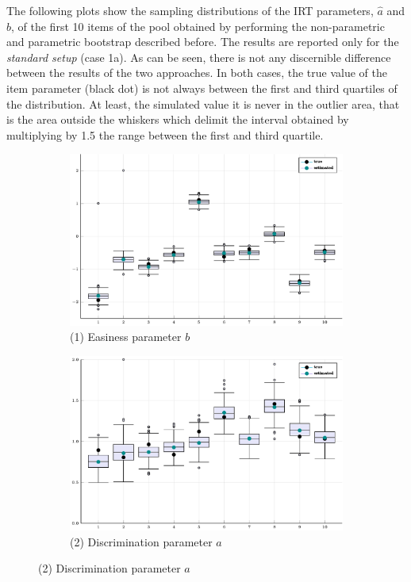 The following plots show the sampling distributions of the IRT parameters, $\hat{a}$ and $\hat{b}$, of the first 10 items of the pool obtained by performing the non-parametric and parametric bootstrap described before. The results are reported only for the \emph{standard setup} (case 1a).
As can be seen, there is not any discernible difference between the results of the two approaches. In both cases, the true value of the item parameter (black dot) is not always between the first and third quartiles of the distribution. At least, the simulated value it is never in the outlier area, that is the area outside the whiskers which delimit the interval obtained by multiplying by 1.5 the range between the first and third quartile.

\captionsetup[subfigure]{labelformat=empty}

\begin{figure}[H]
	\centering
	\begin{subfigure}[t]{0.8\textwidth}
		\centering
		\includegraphics[width=\linewidth]{Figures/bootstrap/BSb_npar.pdf}
		\caption{(1) Easiness parameter $b$} 
	\end{subfigure}
	\begin{subfigure}[t]{0.8\textwidth}
		\centering
		\includegraphics[width=\linewidth]{Figures/bootstrap/BSa_npar.pdf}
		\caption{(2)  Discrimination parameter $a$} 
	\end{subfigure}
	

\end{figure}
